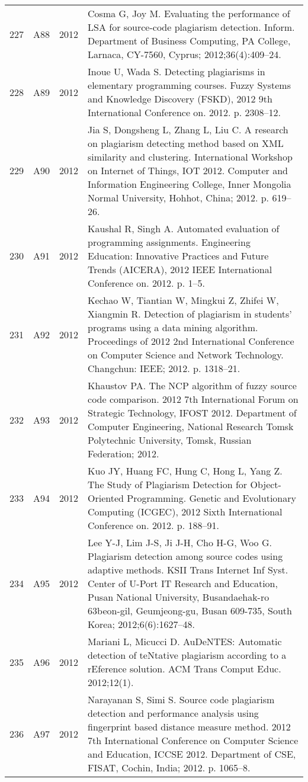 \documentclass{article}\usepackage[]{graphicx}\usepackage[]{color}
\begin{document}
\begin{longtable}{l|L{1cm}|L{1cm}|L{12cm}|}
  227 & A88 & 2012 & Cosma G, Joy M. Evaluating the performance of LSA for source-code plagiarism detection. Inform. Department of Business Computing, PA College, Larnaca, CY-7560, Cyprus; 2012;36(4):409–24. \\ 
  228 & A89 & 2012 & Inoue U, Wada S. Detecting plagiarisms in elementary programming courses. Fuzzy Systems and Knowledge Discovery (FSKD), 2012 9th International Conference on. 2012. p. 2308–12. \\ 
  229 & A90 & 2012 & Jia S, Dongsheng L, Zhang L, Liu C. A research on plagiarism detecting method based on XML similarity and clustering. International Workshop on Internet of Things, IOT 2012. Computer and Information Engineering College, Inner Mongolia Normal University, Hohhot, China; 2012. p. 619–26. \\ 
  230 & A91 & 2012 & Kaushal R, Singh A. Automated evaluation of programming assignments. Engineering Education: Innovative Practices and Future Trends (AICERA), 2012 IEEE International Conference on. 2012. p. 1–5. \\ 
  231 & A92 & 2012 & Kechao W, Tiantian W, Mingkui Z, Zhifei W, Xiangmin R. Detection of plagiarism in students’ programs using a data mining algorithm. Proceedings of 2012 2nd International Conference on Computer Science and Network Technology. Changchun: IEEE; 2012. p. 1318–21. \\ 
  232 & A93 & 2012 & Khaustov PA. The NCP algorithm of fuzzy source code comparison. 2012 7th International Forum on Strategic Technology, IFOST 2012. Department of Computer Engineering, National Research Tomsk Polytechnic University, Tomsk, Russian Federation; 2012. \\ 
  233 & A94 & 2012 & Kuo JY, Huang FC, Hung C, Hong L, Yang Z. The Study of Plagiarism Detection for Object-Oriented Programming. Genetic and Evolutionary Computing (ICGEC), 2012 Sixth International Conference on. 2012. p. 188–91. \\ 
  234 & A95 & 2012 & Lee Y-J, Lim J-S, Ji J-H, Cho H-G, Woo G. Plagiarism detection among source codes using adaptive methods. KSII Trans Internet Inf Syst. Center of U-Port IT Research and Education, Pusan National University, Busandaehak-ro 63beon-gil, Geumjeong-gu, Busan 609-735, South Korea; 2012;6(6):1627–48. \\ 
  235 & A96 & 2012 & Mariani L, Micucci D. AuDeNTES: Automatic detection of teNtative plagiarism according to a rEference solution. ACM Trans Comput Educ. 2012;12(1). \\ 
  236 & A97 & 2012 & Narayanan S, Simi S. Source code plagiarism detection and performance analysis using fingerprint based distance measure method. 2012 7th International Conference on Computer Science and Education, ICCSE 2012. Department of CSE, FISAT, Cochin, India; 2012. p. 1065–8. \\ 

\end{longtable}
\end{document}
